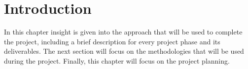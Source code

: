 \section{Introduction}
In this chapter insight is given into the approach that will be used to complete the project, including a brief description for every project phase and its deliverables. The next section will focus on the methodologies that will be used during the project. Finally, this chapter will focus on the project planning.

